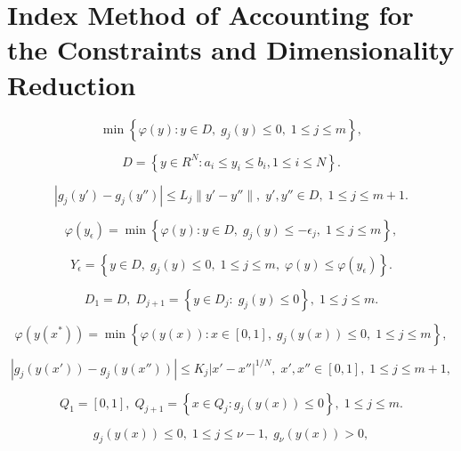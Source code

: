 \documentclass[review]{elsarticle}
\begin{document}
\section{Index Method of Accounting for the Constraints and Dimensionality Reduction}

\begin{equation}\label{problem}
	\min{\left\{\varphi(y):y \in D, \; g_j(y)\leq 0, \; 1 \leq j \leq m\right\}},
\end{equation}

\begin{equation}\label{D}
	D=\left\{y\in R^N: a_i\leq y_i \leq b_i, 1\leq i \leq N\right\}.
\end{equation}

\begin{equation}\label{lipschitz_condition}
	\left|g_j(y')-g_j (y'')\right| \leq L_j \|y'-y''\|, \; y', y''\in D, \; 1\leq j \leq m+1.
\end{equation}

\begin{equation}\label{epsilon_reserved_solution}
	\varphi(y_{\epsilon})=\min{\left\{\varphi(y):y \in D, \; g_j(y)\leq -{\epsilon}_j, \; 1 \leq j \leq m\right\}},
\end{equation}

\begin{equation}\label{Y_epsilon}
	Y_{\epsilon}=\left\{ y \in D, \; g_j(y) \leq 0, \; 1 \leq j \leq m, \; \varphi(y) \leq \varphi(y_{\epsilon}) \right\}.
\end{equation}

\begin{equation}\label{D_sets}
	D_1 = D, \; D_{j+1} = \left\{ y \in D_j: \; g_j(y) \leq 0 \right\}, \; 1 \leq j \leq m.
\end{equation}

\begin{equation}\label{one_dimensional_problem}
	\varphi(y(x^\ast))=\min \left\{\varphi(y(x)): x \in [0,1], \; g_j(y(x))\leq 0, \; 1 \leq j \leq m\right\},
\end{equation}

\[
	\left|g_j(y(x'))-g_j(y(x''))\right| \leq K_j \left|x'-x'' \right|^{1/N}, \; x', x''\in [0,1], \; 1\leq j \leq m+1,
\]

\begin{equation}\label{Q_intervals}
	Q_1=[0,1], \; Q_{j+1}=\left\{x \in Q_j : g_j(y(x)) \leq 0 \right\}, \; 1 \leq j \leq m.
\end{equation}

\[
	g_j(y(x)) \leq 0, \; 1 \leq j \leq \nu-1, \; g_{\nu}(y(x))>0,
\]
\end{document}
